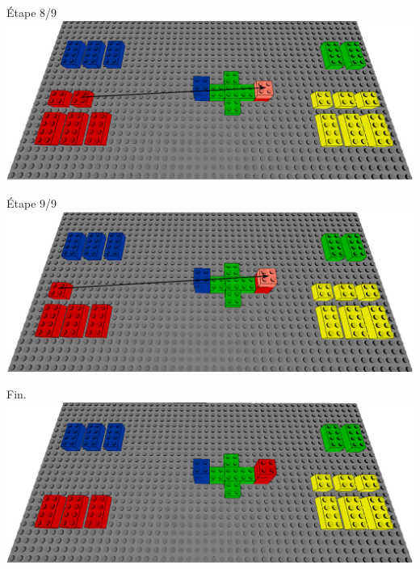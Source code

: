 \documentclass[aspectratio=169]{beamer}
\begin{document}
\begin{frame}
    Étape 8/9
    \vfill
  \includegraphics[width=\linewidth]{step7.png}
\end{frame}

\begin{frame}
    Étape 9/9
    \vfill
  \includegraphics[width=\linewidth]{step9.png}
\end{frame}

\begin{frame}
    Fin.
    \vfill
  \includegraphics[width=\linewidth]{end.png}
\end{frame}
\end{document}
